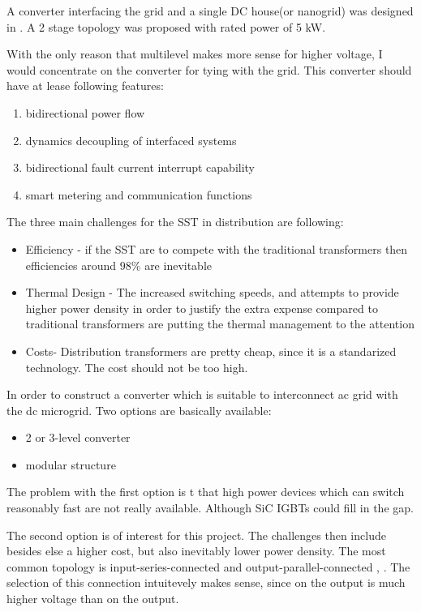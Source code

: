 \documentclass[]{scrartcl}
\begin{document}
A converter interfacing the grid and a single DC house(or nanogrid) was designed in \cite{Dong2013}. A 2 stage topology was proposed with rated power of 5 kW. 

With the only reason that multilevel makes more sense for higher voltage, I would concentrate on the converter for tying with the grid. This converter should have at lease following features\cite{Dong2013}\cite{Doncker2014}:

\begin{enumerate}
	\item bidirectional power flow
	\item dynamics decoupling of interfaced systems
	\item bidirectional fault current interrupt capability
	\item smart metering and communication functions
\end{enumerate}

The three main challenges for the SST in distribution are following\cite{Huang2013}:
\begin{itemize}
	\item Efficiency - if the SST are to compete with the traditional transformers then efficiencies around $98\%$ are inevitable 
	\item Thermal Design - The increased switching speeds, and attempts to provide higher power density in order to justify the extra expense compared to traditional transformers are putting the thermal management to the attention
	\item Costs- Distribution transformers are pretty cheap, since it is a  standarized technology. The cost should not be too high. 
\end{itemize}

In order to construct a converter which is suitable to interconnect ac grid with the dc microgrid. Two options are basically available:
\begin{itemize}
	\item 2 or 3-level converter
	\item modular structure 
\end{itemize} 
The problem with the first option is t that high power devices which can switch reasonably fast are not really available. Although SiC IGBTs could fill in the gap. 

The second option is of interest for this project. The challenges then include besides else a higher cost, but also inevitably lower power density. The most common topology is input-series-connected and output-parallel-connected \cite{Fan2011}, \cite{wang2014}. The selection of this connection intuitevely makes sense, since on the output is much higher voltage than on the output. 
\end{document}
